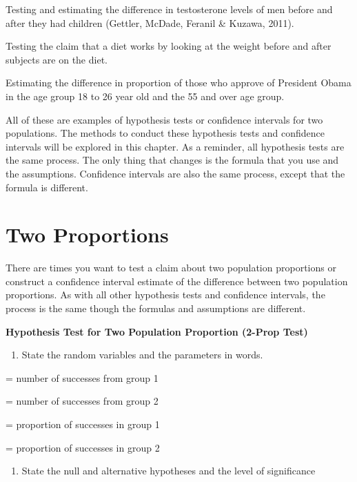 \documentclass[
]{book}
\providecommand{\tightlist}{%
  \setlength{\itemsep}{0pt}\setlength{\parskip}{0pt}}
\begin{document}
Testing and estimating the difference in testosterone levels of men before and after they had children (Gettler, McDade, Feranil \& Kuzawa, 2011).

Testing the claim that a diet works by looking at the weight before and after subjects are on the diet.

Estimating the difference in proportion of those who approve of President Obama in the age group 18 to 26 year old and the 55 and over age group.

All of these are examples of hypothesis tests or confidence intervals for two populations. The methods to conduct these hypothesis tests and confidence intervals will be explored in this chapter. As a reminder, all hypothesis tests are the same process. The only thing that changes is the formula that you use and the assumptions. Confidence intervals are also the same process, except that the formula is different.

\hypertarget{two-proportions}{%
\section{Two Proportions}\label{two-proportions}}

There are times you want to test a claim about two population proportions or construct a confidence interval estimate of the difference between two population proportions. As with all other hypothesis tests and confidence intervals, the process is the same though the formulas and assumptions are different.

\textbf{Hypothesis Test for Two Population Proportion (2-Prop Test)}

\begin{enumerate}
\def\labelenumi{\arabic{enumi}.}
\tightlist
\item
  State the random variables and the parameters in words.
\end{enumerate}

= number of successes from group 1

= number of successes from group 2

= proportion of successes in group 1

= proportion of successes in group 2

\begin{enumerate}
\def\labelenumi{\arabic{enumi}.}
\setcounter{enumi}{1}
\tightlist
\item
  State the null and alternative hypotheses and the level of significance
\end{enumerate}
\end{document}
